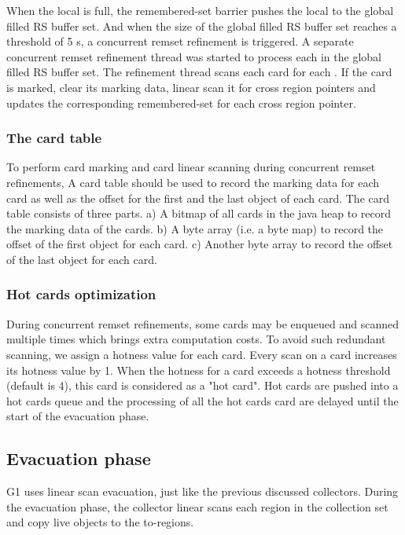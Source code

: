 When the local  is full, the remembered-set barrier
pushes the local  to the global filled RS buffer set.
And when the size of the global filled RS buffer set reaches a threshold of 5 s,
a concurrent remset refinement is triggered.
A separate concurrent remset refinement thread was started to process each
 in the global filled RS buffer set.
The refinement thread scans each card for each .
If the card is marked, clear its marking data, linear scan it for cross region pointers
and updates the corresponding remembered-set for each cross region pointer.

\subsubsection{The card table}

To perform card marking and card linear scanning during concurrent remset refinements,
A card table should be used to record the marking data for each card as well as the offset
for the first and the last object of each card.
The card table consists of three parts. a) A bitmap of all cards in the java heap
to record the marking data of the cards. b) A byte array (i.e. a byte map) to record the
offset of the first object for each card. c) Another byte array to record the
offset of the last object for each card.

\subsubsection{Hot cards optimization}

During concurrent remset refinements, some cards may be enqueued and scanned multiple times
which brings extra computation costs. To avoid such redundant scanning, we assign
a hotness value for each card. Every scan on a card increases its hotness value by 1.
When the hotness for a card exceeds a hotness threshold (default is 4), this card is considered
as a "hot card". Hot cards are pushed into a hot cards queue and the processing
of all the hot cards card are delayed until the start of the evacuation phase.

\subsection{Evacuation phase}

G1 uses linear scan evacuation, just like the previous discussed collectors.
During the evacuation phase, the collector linear scans each region in the collection
set and copy live objects to the to-regions.

